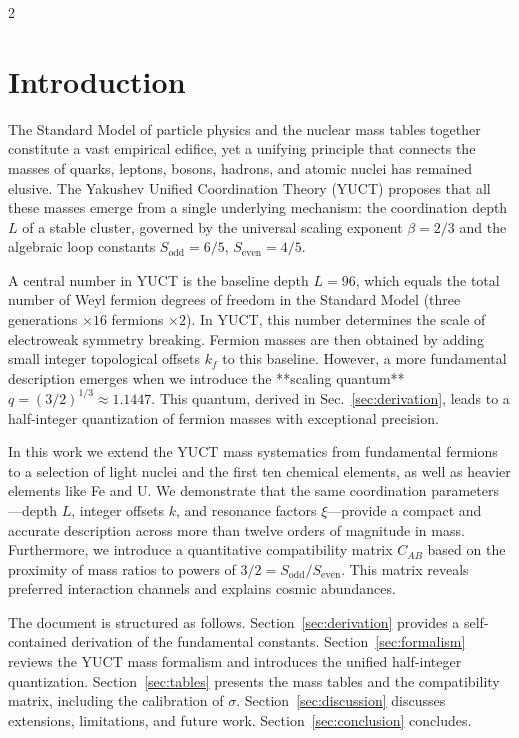 \documentclass[11pt,a4paper]{article}
\begin{document}
	\vspace{0.4cm}
	
	\begin{multicols}{2}
		
		\section{Introduction}
		
		The Standard Model of particle physics and the nuclear mass tables together constitute a vast empirical edifice, yet a unifying principle that connects the masses of quarks, leptons, bosons, hadrons, and atomic nuclei has remained elusive. The Yakushev Unified Coordination Theory (YUCT) proposes that all these masses emerge from a single underlying mechanism: the coordination depth \(L\) of a stable cluster, governed by the universal scaling exponent \(\beta = 2/3\) and the algebraic loop constants \(S_{\mathrm{odd}}=6/5\), \(S_{\mathrm{even}}=4/5\). 
		
		A central number in YUCT is the baseline depth \(L = 96\), which equals the total number of Weyl fermion degrees of freedom in the Standard Model (three generations $\times 16$ fermions $\times 2$). In YUCT, this number determines the scale of electroweak symmetry breaking. Fermion masses are then obtained by adding small integer topological offsets \(k_f\) to this baseline. However, a more fundamental description emerges when we introduce the **scaling quantum** \(q = (3/2)^{1/3} \approx 1.1447\). This quantum, derived in Sec.~\ref{sec:derivation}, leads to a half-integer quantization of fermion masses with exceptional precision.
		
		In this work we extend the YUCT mass systematics from fundamental fermions to a selection of light nuclei and the first ten chemical elements, as well as heavier elements like Fe and U. We demonstrate that the same coordination parameters—depth \(L\), integer offsets \(k\), and resonance factors \(\xi\)—provide a compact and accurate description across more than twelve orders of magnitude in mass. Furthermore, we introduce a quantitative compatibility matrix \(C_{AB}\) based on the proximity of mass ratios to powers of \(3/2 = S_{\mathrm{odd}}/S_{\mathrm{even}}\). This matrix reveals preferred interaction channels and explains cosmic abundances.
		
		The document is structured as follows. Section~\ref{sec:derivation} provides a self-contained derivation of the fundamental constants. Section~\ref{sec:formalism} reviews the YUCT mass formalism and introduces the unified half-integer quantization. Section~\ref{sec:tables} presents the mass tables and the compatibility matrix, including the calibration of \(\sigma\). Section~\ref{sec:discussion} discusses extensions, limitations, and future work. Section~\ref{sec:conclusion} concludes.
		

\end{multicols}
\end{document}
